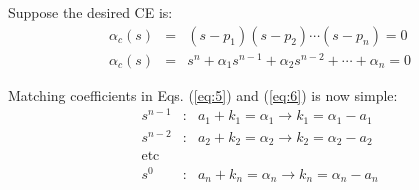 Suppose the desired CE is:
\begin{eqnarray}
	\alpha_c(s) & = & (s-p_1)(s-p_2)\cdots(s-p_n)=0 \nonumber \\
	\alpha_c(s) & = & s^n + \alpha_1s^{n-1} + \alpha_2s^{n-2} + \cdots + \alpha_n = 0 \label{eq:6}
\end{eqnarray}

Matching coefficients in Eqs. (\ref{eq:5})  and (\ref{eq:6})  is now simple:
\begin{eqnarray*}
	s^{n - 1}  & : & a_1  + k_1  = \alpha _1  \to k_1  = \alpha _1  - a_1 \\
	s^{n - 2}  & : & a_2  + k_2  = \alpha _2  \to k_2  = \alpha _2  - a_2 \\
	\mathrm{etc}  \\
	s^{0}  & : & a_n  + k_n  = \alpha _n  \to k_n  = \alpha _n  - a_n				
\end{eqnarray*}

\endinput

